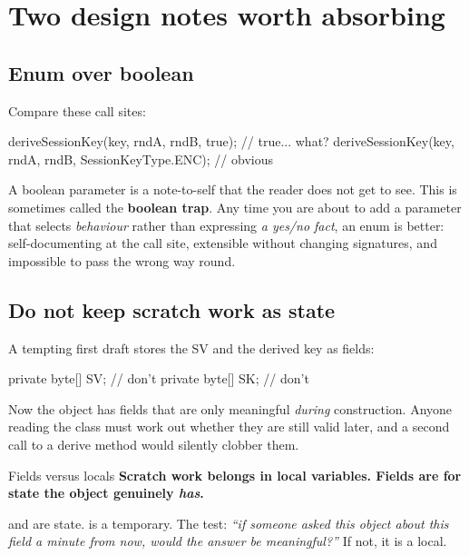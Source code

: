 \section{Two design notes worth absorbing}

\subsection{Enum over boolean}

Compare these call sites:

\begin{jcode}
deriveSessionKey(key, rndA, rndB, true);                 // true... what?
deriveSessionKey(key, rndA, rndB, SessionKeyType.ENC);   // obvious
\end{jcode}

A boolean parameter is a note-to-self that the reader does not get to see. This
is sometimes called the \textbf{boolean trap}. Any time you are about to add a
 parameter that selects \emph{behaviour} rather than expressing
\emph{a yes/no fact}, an enum is better: self-documenting at the call site,
extensible without changing signatures, and impossible to pass the wrong way
round.

\subsection{Do not keep scratch work as state}

A tempting first draft stores the SV and the derived key as fields:

\begin{jcode}
private byte[] SV;      // don't
private byte[] SK;      // don't
\end{jcode}

Now the object has fields that are only meaningful \emph{during} construction.
Anyone reading the class must work out whether they are still valid later, and a
second call to a derive method would silently clobber them.

\begin{concept}{Fields versus locals}
\textbf{Scratch work belongs in local variables. Fields are for state the object
genuinely \emph{has}.}

 and  are state.  is a temporary. The test:
\emph{``if someone asked this object about this field a minute from now, would
the answer be meaningful?''} If not, it is a local.
\end{concept}

